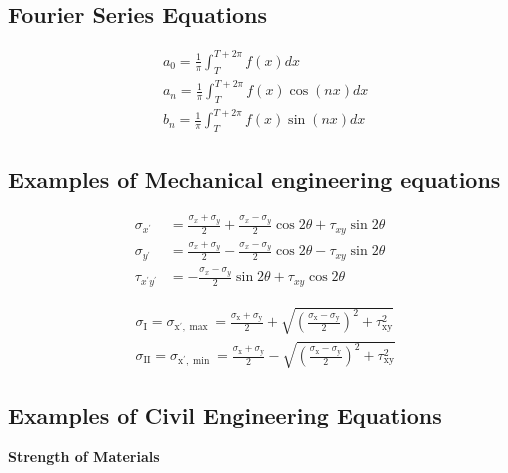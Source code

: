 \documentclass[10pt]{article}
\begin{document}
\subsection{Fourier Series Equations}
$$
\begin{aligned}
&a_0=\frac{1}{\pi} \int_T^{T+2 \pi} f(x) d x \\
&a_n=\frac{1}{\pi} \int_T^{T+2 \pi} f(x) \cos (n x) d x \\
&b_n=\frac{1}{\pi} \int_T^{T+2 \pi} f(x) \sin (n x) d x
\end{aligned}
$$

\subsection{Examples of Mechanical engineering equations}

$$
\begin{aligned}
\sigma_{x^{\prime}} &=\frac{\sigma_x+\sigma_y}{2}+\frac{\sigma_x-\sigma_y}{2} \cos 2 \theta+\tau_{x y} \sin 2 \theta \\
\sigma_{y^{\prime}} &=\frac{\sigma_x+\sigma_y}{2}-\frac{\sigma_x-\sigma_y}{2} \cos 2 \theta-\tau_{x y} \sin 2 \theta \\
\tau_{x^{\prime} y^{\prime}} &=-\frac{\sigma_x-\sigma_y}{2} \sin 2 \theta+\tau_{x y} \cos 2 \theta
\end{aligned}
$$


$$
\begin{aligned}
&\sigma_{\mathrm{I}}=\sigma_{\mathrm{x}^{\prime}, \max }=\frac{\sigma_{\mathrm{x}}+\sigma_{\mathrm{y}}}{2}+\sqrt{\left(\frac{\sigma_{\mathrm{x}}-\sigma_{\mathrm{y}}}{2}\right)^2+\tau_{\mathrm{xy}}^2} \\
&\sigma_{\mathrm{II}}=\sigma_{\mathrm{x}^{\prime}, \min }=\frac{\sigma_{\mathrm{x}}+\sigma_{\mathrm{y}}}{2}-\sqrt{\left(\frac{\sigma_{\mathrm{x}}-\sigma_{\mathrm{y}}}{2}\right)^2+\tau_{\mathrm{xy}}^2}
\end{aligned}
$$

\newpage

\subsection{Examples of Civil Engineering Equations}
\textbf{Strength of Materials}
\end{document}
